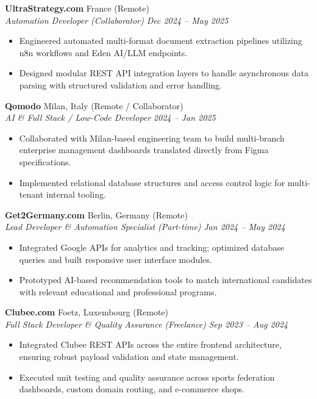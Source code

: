 \documentclass[10pt, a4paper]{article}
\begin{document}
\vspace{3pt}
\textbf{UltraStrategy.com} \hfill France (Remote) \\
\textit{Automation Developer (Collaborator)} \hfill \textit{Dec 2024 -- May 2025}
\begin{itemize}
    \item Engineered automated multi-format document extraction pipelines utilizing n8n workflows and Eden AI/LLM endpoints.
    \item Designed modular REST API integration layers to handle asynchronous data parsing with structured validation and error handling.
\end{itemize}

\vspace{3pt}
\textbf{Qomodo} \hfill Milan, Italy (Remote / Collaborator) \\
\textit{AI \& Full Stack / Low-Code Developer} \hfill \textit{2024 -- Jan 2025}
\begin{itemize}
    \item Collaborated with Milan-based engineering team to build multi-branch enterprise management dashboards translated directly from Figma specifications.
    \item Implemented relational database structures and access control logic for multi-tenant internal tooling.
\end{itemize}

\vspace{3pt}
\textbf{Get2Germany.com} \hfill Berlin, Germany (Remote) \\
\textit{Lead Developer \& Automation Specialist (Part-time)} \hfill \textit{Jan 2024 -- May 2024}
\begin{itemize}
    \item Integrated Google APIs for analytics and tracking; optimized database queries and built responsive user interface modules.
    \item Prototyped AI-based recommendation tools to match international candidates with relevant educational and professional programs.
\end{itemize}

\vspace{3pt}
\textbf{Clubee.com} \hfill Foetz, Luxembourg (Remote) \\
\textit{Full Stack Developer \& Quality Assurance (Freelance)} \hfill \textit{Sep 2023 -- Aug 2024}
\begin{itemize}
    \item Integrated Clubee REST APIs across the entire frontend architecture, ensuring robust payload validation and state management.
    \item Executed unit testing and quality assurance across sports federation dashboards, custom domain routing, and e-commerce shops.
\end{itemize}
\end{document}
